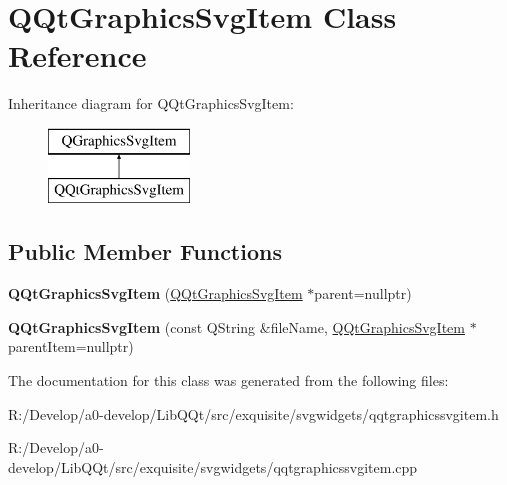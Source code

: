 \hypertarget{class_q_qt_graphics_svg_item}{}\section{Q\+Qt\+Graphics\+Svg\+Item Class Reference}
\label{class_q_qt_graphics_svg_item}
Inheritance diagram for Q\+Qt\+Graphics\+Svg\+Item\+:\begin{figure}[H]
\begin{center}
\leavevmode
\includegraphics[height=2.000000cm]{class_q_qt_graphics_svg_item}
\end{center}
\end{figure}
\subsection*{Public Member Functions}
\begin{DoxyCompactItemize}
\item 
\mbox{\label{class_q_qt_graphics_svg_item_a23196102592eba948df7ac2f5840537f}} 
{\bfseries Q\+Qt\+Graphics\+Svg\+Item} (\mbox{\hyperlink{class_q_qt_graphics_svg_item}{Q\+Qt\+Graphics\+Svg\+Item}} $\ast$parent=nullptr)
\item 
\mbox{\label{class_q_qt_graphics_svg_item_ae28218cf6aee47be5174bf86b9049b1f}} 
{\bfseries Q\+Qt\+Graphics\+Svg\+Item} (const Q\+String \&file\+Name, \mbox{\hyperlink{class_q_qt_graphics_svg_item}{Q\+Qt\+Graphics\+Svg\+Item}} $\ast$parent\+Item=nullptr)
\end{DoxyCompactItemize}


The documentation for this class was generated from the following files\+:\begin{DoxyCompactItemize}
\item 
R\+:/\+Develop/a0-\/develop/\+Lib\+Q\+Qt/src/exquisite/svgwidgets/qqtgraphicssvgitem.\+h\item 
R\+:/\+Develop/a0-\/develop/\+Lib\+Q\+Qt/src/exquisite/svgwidgets/qqtgraphicssvgitem.\+cpp\end{DoxyCompactItemize}
